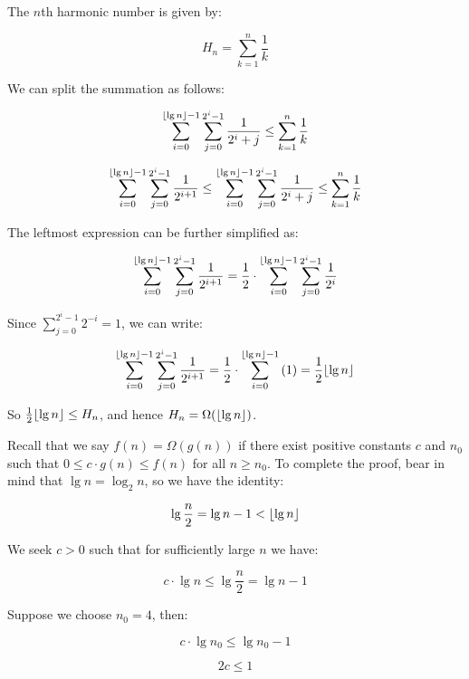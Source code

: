 \documentclass[a4paper,12pt]{article}
\DeclarePairedDelimiter\floor{\lfloor}{\rfloor}
\begin{document}
\vspace{5mm}

The $n$th harmonic number is given by:

\[ H_n = \sum_{k=1}^n \frac{1}{k} \]

We can split the summation as follows:

\[ \sum_{i=0}^{\floor{\lg n}-1} \sum_{j=0}^{2^i-1} \frac{1}{2^i+j} \le \sum_{k=1}^n \frac{1}{k} \]

\[ \sum_{i=0}^{\floor{\lg n}-1} \sum_{j=0}^{2^i-1} \frac{1}{2^{i+1}} \le \sum_{i=0}^{\floor{\lg n}-1} \sum_{j=0}^{2^i-1} \frac{1}{2^i+j} \le \sum_{k=1}^n \frac{1}{k} \]

The leftmost expression can be further simplified as: 

\[ \sum_{i=0}^{\floor{\lg n}-1} \sum_{j=0}^{2^i-1} \frac{1}{2^{i+1}}  = \frac{1}{2} \cdot \sum_{i=0}^{\floor{\lg n}-1} \sum_{j=0}^{2^i-1} \frac{1}{2^{i}} \]

Since $\sum_{j=0}^{2^i-1} 2^{-i} =1$, we can write:

\[ \sum_{i=0}^{\floor{\lg n}-1} \sum_{j=0}^{2^i-1} \frac{1}{2^{i+1}}  = \frac{1}{2} \cdot \sum_{i=0}^{\floor{\lg n}-1} \left(1\right) = \frac{1}{2} \floor{\lg n} \]

So $\frac{1}{2} \floor{\lg n} \le H_n$, and hence $H_n = \Omega(\floor{\lg n})$.  

\vspace{2mm}
Recall that we say $f(n) = \Omega(g(n))$ if there exist positive constants $c$ and $n_0$ such that $0 \le c \cdot g(n) \le f(n)$ for all $n \ge n_0$. To complete the proof, bear in mind that $\lg n = \log_2 n$, so we have the identity:

\[ \lg \frac{n}{2} =  \lg n - 1 < \floor{\lg n} \]

We seek $c > 0$ such that for sufficiently large $n$ we have:

\[ c \cdot \lg n \le \lg \frac{n}{2} = \lg n - 1 \]

Suppose we choose $n_0 = 4$, then:

\[ c \cdot \lg n_0 \le \lg n_0 - 1 \]

\[ 2c \le 1\]
\end{document}

